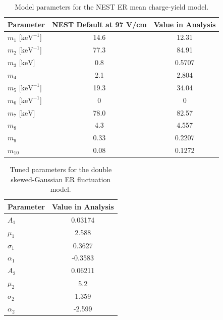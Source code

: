 \begin{table}[ht]
    \centering
    \caption{
       Model parameters for the NEST ER mean
        charge-yield model.
    }
    \begin{tabular}{lcc}
        \hline\hline
        Parameter & {NEST Default at 97 V/cm} & {Value in Analysis} \\
        \hline
        $m_{1}$ [$\mathrm{keV}^{-1}$] & 14.6 & 12.31 \\
        $m_{2}$ [$\mathrm{keV}^{-1}$] & 77.3 & 84.91 \\
        $m_{3}$ [$\mathrm{keV}$]      & 0.8  & 0.5707 \\
        $m_{4}$                       & 2.1  & 2.804 \\
        $m_{5}$ [$\mathrm{keV}^{-1}$] & 19.3 & 34.04 \\
        $m_{6}$ [$\mathrm{keV}^{-1}$] & 0    & 0 \\
        $m_{7}$ [$\mathrm{keV}$]      & 78.0 & 82.57 \\
        $m_{8}$                       & 4.3  & 4.557 \\
        $m_{9}$                       & 0.33 & 0.2207 \\
        $m_{10}$                      & 0.08 & 0.1272 \\
        \hline\hline
    \end{tabular}
    \label{tab:eft2024_er_mean_yield}
\end{table}

\begin{table}[ht]
    \centering
    \caption{Tuned parameters for the double skewed-Gaussian ER fluctuation model.}
    \begin{tabular}{lc}
        \hline\hline
        Parameter & Value in Analysis \\
        \hline
        $A_1$      & 0.03174 \\
        $\mu_1$    & 2.588 \\
        $\sigma_1$ & 0.3627 \\
        $\alpha_1$ & -0.3583 \\
        \hline
        $A_2$      & 0.06211 \\
        $\mu_2$    & 5.2 \\
        $\sigma_2$ & 1.359 \\
        $\alpha_2$ & -2.599 \\
        \hline\hline
    \end{tabular}
    \label{tab:eft2024_er_double_gaussian_parameters}
\end{table}

